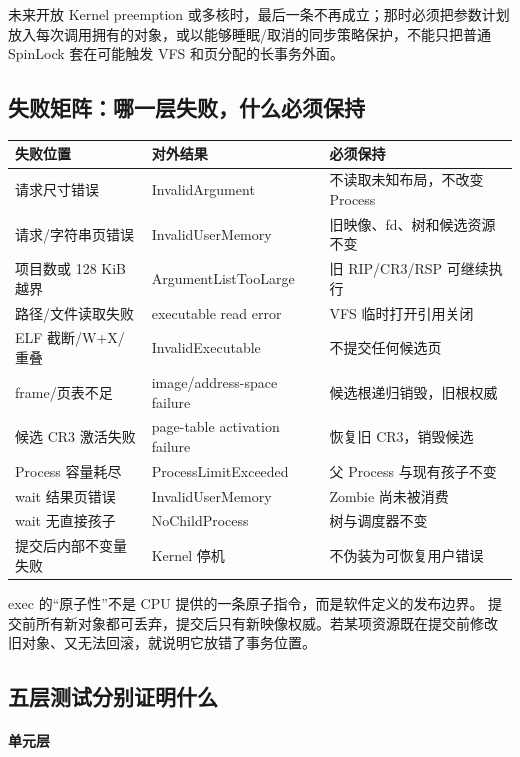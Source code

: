 未来开放 Kernel preemption 或多核时，最后一条不再成立；那时必须把参数计划
放入每次调用拥有的对象，或以能够睡眠/取消的同步策略保护，不能只把普通
SpinLock 套在可能触发 VFS 和页分配的长事务外面。

\subsection{失败矩阵：哪一层失败，什么必须保持}

\begin{longtable}{L{0.25\textwidth}L{0.29\textwidth}L{0.35\textwidth}}
\toprule
失败位置 & 对外结果 & 必须保持\\
\midrule
请求尺寸错误 & InvalidArgument & 不读取未知布局，不改变 Process\\
请求/字符串页错误 & InvalidUserMemory & 旧映像、fd、树和候选资源不变\\
项目数或 128 KiB 越界 & ArgumentListTooLarge & 旧 RIP/CR3/RSP 可继续执行\\
路径/文件读取失败 & executable read error & VFS 临时打开引用关闭\\
ELF 截断/W+X/重叠 & InvalidExecutable & 不提交任何候选页\\
frame/页表不足 & image/address-space failure & 候选根递归销毁，旧根权威\\
候选 CR3 激活失败 & page-table activation failure & 恢复旧 CR3，销毁候选\\
Process 容量耗尽 & ProcessLimitExceeded & 父 Process 与现有孩子不变\\
wait 结果页错误 & InvalidUserMemory & Zombie 尚未被消费\\
wait 无直接孩子 & NoChildProcess & 树与调度器不变\\
提交后内部不变量失败 & Kernel 停机 & 不伪装为可恢复用户错误\\
\bottomrule
\end{longtable}

\begin{failurebox}
exec 的“原子性”不是 CPU 提供的一条原子指令，而是软件定义的发布边界。
提交前所有新对象都可丢弃，提交后只有新映像权威。若某项资源既在提交前修改
旧对象、又无法回滚，就说明它放错了事务位置。
\end{failurebox}

\subsection{五层测试分别证明什么}

\paragraph{单元层}

